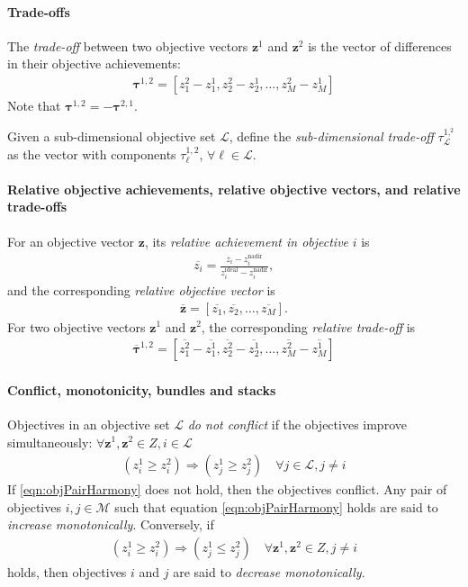 \paragraph{Trade-offs}
The \textit{trade-off} between two objective vectors $\mathbf{z}^1$ and $\mathbf{z}^2$ is the vector of differences in their objective achievements:
\begin{align}
\mathbf{\tau}^{1,2} = [z^2_1 - z^1_1, z^2_2 - z^1_2, \ldots, z^2_M - z^1_M]
\end{align}
Note that $\mathbf{\tau}^{1,2} = - \mathbf{\tau}^{2,1}$.

Given a sub-dimensional objective set $\mathcal{L}$, define the \textit{sub-dimensional trade-off} $\tau^{1,^2}_\mathcal{L}$ as the vector with components $\tau^{1,2}_\ell$, $\forall \ell \in \mathcal{L}$.

\paragraph{Relative objective achievements, relative objective vectors, and relative trade-offs}
For an objective vector $\mathbf{z}$, its \textit{relative achievement in objective }$i$ is
\begin{align}
\overbar{z_i} = \frac{z_i - z^\text{nadir}_i}{z^\text{ideal}_i - z^\text{nadir}_i},
\end{align}
and the corresponding \textit{relative objective vector} is
\begin{align}
\overbar{\mathbf{z}} = [\overbar{z_1},\overbar{z_2},\ldots,\overbar{z_M}].
\end{align}
For two objective vectors $\mathbf{z}^1$ and $\mathbf{z}^2$, the corresponding \textit{relative trade-off} is
\begin{align}
\overbar{\mathbf{\tau}}^{1,2} = \left[\overbar{z^2_1} - \overbar{z^1_1}, \overbar{z^2_2} - \overbar{z^1_2}, \ldots, \overbar{z^2_M} - \overbar{z^1_M}\right]
\end{align}

\paragraph{Conflict, monotonicity, bundles and stacks}
Objectives in an objective set $\mathcal{L}$ \textit{do not conflict} if the objectives improve simultaneously:
$\forall \mathbf{z}^1, \mathbf{z}^2 \in Z, i \in \mathcal{L}$
\begin{align}
(z^1_i \ge z^2_i) \Rightarrow (z^1_j \ge z^2_j) \quad \forall j \in \mathcal{L}, j \neq i \label{eqn:objPairHarmony}
\end{align}
If \eqref{eqn:objPairHarmony} does not hold, then the objectives conflict. Any pair of objectives $i,j \in \mathcal{M}$ such that equation \eqref{eqn:objPairHarmony} holds are said to \textit{increase monotonically}. Conversely, if 
\begin{align}
(z^1_i \ge z^2_i) \Rightarrow (z^1_j \le z^2_j) \quad \forall \mathbf{z}^1, \mathbf{z}^2 \in Z, j \neq i \label{eqn:objPairMonoDec}
\end{align}
holds, then objectives $i$ and $j$ are said to \textit{decrease monotonically}.

